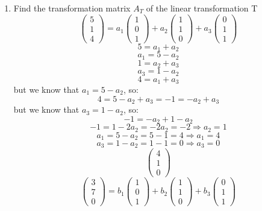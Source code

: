 \documentclass[a3paper,12pt]{extarticle} %
\begin{document}
\begin{enumerate}
\[    \]
    \begin{enumerate}
        \item Find the transformation matrix \(A_T\) of the linear transformation T
        \[
            \begin{pmatrix}
                5  \\
                1  \\
                4 
            \end{pmatrix} = a_1 \begin{pmatrix} 1 \\ 0 \\ 1 \end{pmatrix} + a_2 \begin{pmatrix} 1 \\ 1 \\ 0 \end{pmatrix} + a_3 \begin{pmatrix} 0 \\ 1 \\ 1 \end{pmatrix}
        \]
        \[
            5 = a_1 + a_2
        \]
        \[
                a_1 = 5 - a_2
        \]
        \[
            1 = a_2 + a_3
        \]
        \[
            a_3 = 1 - a_2
        \]
        \[
            4 = a_1 + a_3
        \]
        but we know that \( a_1 = 5 - a_2 \), so:
        \[
            4 = 5 - a_2 + a_3 = -1 = -a_2 + a_3
        \]
        but we know that \( a_3 = 1 - a_2 \), so:
        \[
            -1 = -a_2 + 1 - a_2
        \]
        \[
            -1 = 1 - 2a_2 = -2a_2 = -2 \Rightarrow a_2 = 1
        \]
        \[
            a_1 = 5 - a_2 = 5 - 1 = 4 \Rightarrow a_1 = 4
        \]
        \[
            a_3 = 1 - a_2 = 1 - 1 = 0 \Rightarrow a_3 = 0
        \]
        \[
            \begin{pmatrix}
                4  \\
                1  \\
                0
            \end{pmatrix}
        \]
        \[
            \begin{pmatrix}
                3  \\
                7  \\
                0
            \end{pmatrix} = b_1 \begin{pmatrix} 1 \\ 0 \\ 1 \end{pmatrix} + b_2 \begin{pmatrix} 1 \\ 1 \\ 0 \end{pmatrix} + b_3 \begin{pmatrix} 0 \\ 1 \\ 1 \end{pmatrix}
\]
\end{enumerate}
\end{enumerate}
\end{document}
